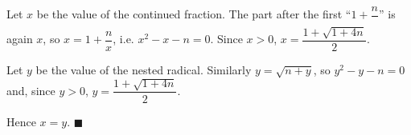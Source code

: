 Let $x$ be the value of the continued fraction. The part after the first ``$1+\dfrac{n}{\ }$'' is again $x$, so $x=1+\dfrac nx$, i.e. $x^2-x-n=0$. Since $x>0$, $x=\dfrac{1+\sqrt{1+4n}}{2}$.

Let $y$ be the value of the nested radical. Similarly $y=\sqrt{n+y}$, so $y^2-y-n=0$ and, since $y>0$, $y=\dfrac{1+\sqrt{1+4n}}{2}$.

Hence $x=y$. $\blacksquare$
